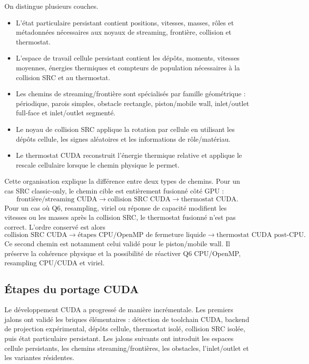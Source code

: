 \documentclass[11pt,a4paper]{article}
\begin{document}
On distingue plusieurs couches.
\begin{itemize}[nosep]
  \item L'état particulaire persistant contient positions, vitesses, masses, rôles et métadonnées nécessaires aux noyaux de streaming, frontière, collision et thermostat.
  \item L'espace de travail cellule persistant contient les dépôts, moments, vitesses moyennes, énergies thermiques et compteurs de population nécessaires à la collision SRC et au thermostat.
  \item Les chemins de streaming/frontière sont spécialisés par famille géométrique : périodique, parois simples, obstacle rectangle, piston/mobile wall, inlet/outlet full-face et inlet/outlet segmenté.
  \item Le noyau de collision SRC applique la rotation par cellule en utilisant les dépôts cellule, les signes aléatoires et les informations de rôle/matériau.
  \item Le thermostat CUDA reconstruit l'énergie thermique relative et applique le rescale cellulaire lorsque le chemin physique le permet.
\end{itemize}

Cette organisation explique la différence entre deux types de chemins. Pour un cas SRC classic-only, le chemin cible est entièrement fusionné côté GPU :
\begin{equation}
  \text{frontière/streaming CUDA}
  \longrightarrow
  \text{collision SRC CUDA}
  \longrightarrow
  \text{thermostat CUDA}.
\end{equation}
Pour un cas où Q6, resampling, viriel ou réponse de capacité modifient les vitesses ou les masses après la collision SRC, le thermostat fusionné n'est pas correct. L'ordre conservé est alors
\begin{equation}
  \text{collision SRC CUDA}
  \longrightarrow
  \text{étapes CPU/OpenMP de fermeture liquide}
  \longrightarrow
  \text{thermostat CUDA post-CPU}.
\end{equation}
Ce second chemin est notamment celui validé pour le piston/mobile wall. Il préserve la cohérence physique et la possibilité de réactiver Q6 CPU/OpenMP, resampling CPU/CUDA et viriel.

\subsection{Étapes du portage CUDA}

Le développement CUDA a progressé de manière incrémentale. Les premiers jalons ont validé les briques élémentaires : détection de toolchain CUDA, backend de projection expérimental, dépôts cellule, thermostat isolé, collision SRC isolée, puis état particulaire persistant. Les jalons suivants ont introduit les espaces cellule persistants, les chemins streaming/frontières, les obstacles, l'inlet/outlet et les variantes résidentes.
\end{document}
